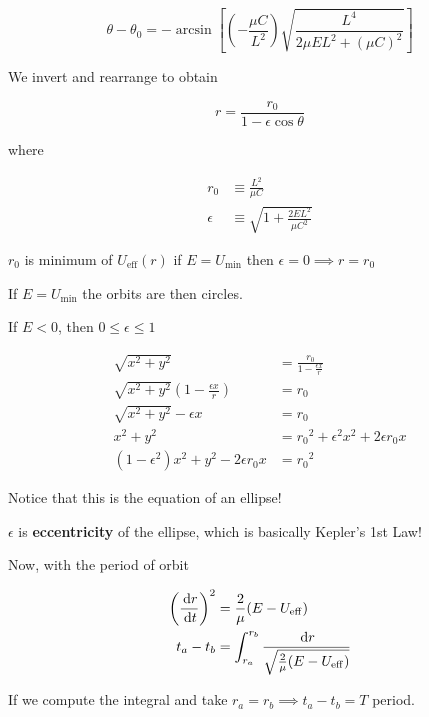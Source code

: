 \begin{equation}
	\theta - \theta_0 = - \arcsin \left[\left(- \frac{\mu C}{L^2}\right) \sqrt{\frac{L^4}{2\mu E L^2 + (\mu C)^2}}\right]
\end{equation}

We invert and rearrange to obtain

\begin{equation}
	r = \frac{r_0}{1 - \epsilon \cos\theta}
\end{equation}

where

\begin{align}
	r_0 &\equiv \frac{L^2}{\mu C}\\
	\epsilon &\equiv \sqrt{1 + \frac{2 E L^2}{\mu C^2}}
\end{align}

\begin{remark}
	$r_0$ is minimum of $U_\mathrm{eff}(r)$ if $E = U_\mathrm{min}$ then $\epsilon = 0 \implies r = r_0$

	If $E = U_\mathrm{min}$ the orbits are then circles.

	If $E < 0$, then $0 \leq \epsilon \leq 1$

	\medskip

	\begin{align}
		\sqrt{x^2 + y^2} &= \frac{r_0}{1 - \frac{\epsilon x}{r}}\\
		\sqrt{x^2 + y^2} \left(1 - \frac{\epsilon x}{r}\right)&= r_0\\
		\sqrt{x^2 + y^2} - \epsilon x &= r_0\\
		x^2 + y^2 &= {r_0}^2 + \epsilon^2 x^2 + 2 \epsilon r_0 x\\
		(1 - \epsilon^2)x^2 + y^2 - 2 \epsilon r_0 x &= {r_0}^2
	\end{align}

	Notice that this is the equation of an ellipse!

	$\epsilon$ is \textbf{eccentricity} of the ellipse, which is basically Kepler's 1st Law!
\end{remark}

Now, with the period of orbit

\begin{align}
	\left(\frac{\D r}{\D t}\right)^2 &= \frac{2}{\mu} (E - U_\mathrm{eff})\\
	t_a - t_b &= \int_{r_a}^{r_b} \frac{\D r}{\sqrt{\frac{2}{\mu} (E - U_\mathrm{eff})}}
\end{align}

If we compute the integral and take $r_a = r_b \implies t_a - t_b = T$ period.

